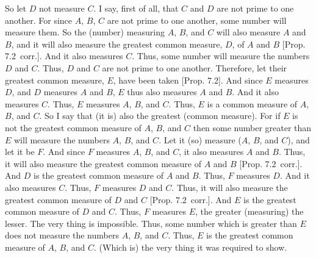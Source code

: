 \begin{Parallel}{}{}
{So let $D$ not measure $C$. I say, first of all, that $C$ and $D$ are not prime
to one another. For since $A$, $B$,  $C$ are not prime to one another,
some number will measure them. So the (number) measuring $A$, $B$, and
$C$ will also measure $A$ and $B$, and it will also measure the greatest common
measure, $D$,  of $A$ and $B$ [Prop. 7.2~corr.].
And it also measures $C$. Thus, some number will measure the numbers $D$ and
$C$. Thus, $D$ and $C$ are not prime to one another. Therefore, let their
greatest common measure, $E$, have been taken  [Prop. 7.2]. And since $E$ measures $D$, and $D$
measures $A$ and $B$, $E$ thus also measures $A$ and $B$. And it also measures $C$.
Thus, $E$ measures $A$, $B$,  and $C$. Thus, $E$ is a common measure of
$A$, $B$,  and $C$. So I say that (it is) also the greatest (common measure).
For if $E$ is not the greatest common measure of $A$, $B$, and $C$ then
some number greater than $E$ will measure the numbers $A$, $B$,  and $C$.
Let it (so) measure ($A$, $B$, and $C$), and let it be $F$. And since $F$
measures $A$, $B$,  and $C$, it also measures $A$ and $B$. 
 Thus, it will also measure the greatest common measure of $A$ and $B$ [Prop. 7.2~corr.]. And $D$ is the greatest common measure
of $A$ and $B$. Thus,  $F$ measures $D$. And it also measures $C$. Thus, $F$
measures $D$ and $C$. Thus, it will also measure the greatest common
measure of $D$ and $C$ [Prop. 7.2~corr.]. And
$E$ is the greatest common measure of $D$ and $C$. Thus, $F$ measures $E$, the
greater (measuring) the lesser. The very thing is impossible. Thus,
some number which is greater than $E$ does not measure the numbers $A$, $B$, and $C$.
Thus, $E$ is the greatest common measure of $A$, $B$, and $C$. (Which is)
the very thing it was required to show.}
\end{Parallel}

